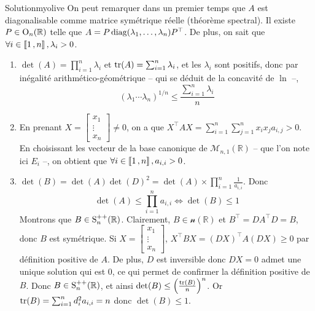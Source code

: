     \begin{demo}{Solution}{myolive}
        On peut remarquer dans un premier temps que $A$ est diagonalisable comme matrice symétrique réelle (théorème spectral). Il existe $P \in \O_n(\mathbb{R})$ telle que $A = P \diag(\lambda_1, \ldots, \lambda_n) P^{\top}$. De plus, on sait que $\forall i \in \intervalleEntier{1}{n}, \lambda_i > 0$.
        \begin{enumerate}
            \item $\det(A) = \prod_{i=1}^{n} \lambda_i$ et $\tr(A) = \sum_{i=1}^{n} \lambda_i$, et les $\lambda_i$ sont positifs, donc par inégalité arithmético-géométrique -- qui se déduit de la concavité de $\ln$ --, 
            \[ \left(\lambda_1\cdots \lambda_n\right)^{1/n} \leq \frac{\sum_{i=1}^{n} \lambda_i}{n} \]
            \item En prenant $X = \begin{bmatrix}
                x_1 \\
                \vdots \\
                x_n
            \end{bmatrix} \neq 0$, on a que $X^{\top} A X = \sum_{i=1}^{n} \sum_{j=1}^{n} x_i x_j a_{i,j} > 0$. En choisissant les vecteur de la base canonique de $\mathcal{M}_{n,1}(\mathbb{R})$ -- que l’on note ici $E_i$ --, on obtient que $\forall i \in \intervalleEntier{1}{n}, a_{i,i} > 0$.
            \item $\det(B) = \det(A) \det(D)^2 = \det(A) \times \prod_{i=1}^{n} \frac{1}{a_{i,i}}$. Donc 
            \[ \det(A) \leq \prod_{i=1}^{n} a_{i,i} \iff \det(B) \leq 1 \]    
            Montrons que $B \in \S_n^{++}(\mathbb{R})$. Clairement, $B \in \mathcal{n}(\mathbb{R})$ et $B^{\top} = D A^{\top} D = B$, donc $B$ est symétrique. Si $X = \begin{bmatrix}
                x_1 \\
                \vdots \\
                x_n
            \end{bmatrix}$, $X^{\top} B X = (DX)^{\top} A (DX) \geq 0$ par définition positive de $A$. De plus, $D$ est inversible donc $DX= 0$ admet une unique solution qui est $0$, ce qui permet de confirmer la définition positive de $B$. Donc $B \in \S_n^{++}(\mathbb{R})$, et ainsi $\det(B) \leq \left(\frac{\tr(B)}{n}\right)^n$. Or $\tr(B) = \sum_{i=1}^{n} d_i^2 a_{i,i} = n$ donc $\det(B) \leq 1$.
        \end{enumerate}
    \end{demo}

